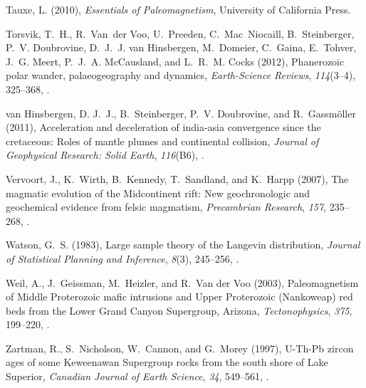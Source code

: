 \documentclass[draft,gc]{AGUTeX}
\begin{document}
\begin{article}
\begin{thebibliography}{24}
{Tauxe}, L. (2010), \textit{Essentials of Paleomagnetism}, University of
  California Press.
  
Torsvik, T.~H., R.~Van~der Voo, U.~Preeden, C.~Mac~Niocaill, B.~Steinberger,
  P.~V. Doubrovine, D.~J.~J. van Hinsbergen, M.~Domeier, C.~Gaina, E.~Tohver,
  J.~G. Meert, P.~J.~A. McCausland, and L.~R.~M. Cocks (2012), Phanerozoic
  polar wander, palaeogeography and dynamics, \textit{Earth-Science Reviews},
  \textit{114}(3--4), 325--368, .

van Hinsbergen, D. J.~J., B.~Steinberger, P.~V. Doubrovine, and
  R.~Gassm{\"o}ller (2011), Acceleration and deceleration of india-asia
  convergence since the cretaceous: Roles of mantle plumes and continental
  collision, \textit{Journal of Geophysical Research: Solid Earth},
  \textit{116}(B6), .

Vervoort, J., K.~Wirth, B.~Kennedy, T.~Sandland, and K.~Harpp (2007), The
  magmatic evolution of the {M}idcontinent rift: New geochronologic and
  geochemical evidence from felsic magmatism, \textit{Precambrian Research},
  \textit{157}, 235--268, .

Watson, G.~S. (1983), Large sample theory of the Langevin distribution,
  \textit{Journal of Statistical Planning and Inference}, \textit{8}(3),
  245--256, .
  
Weil, A., J.~Geissman, M.~Heizler, and R.~{Van der Voo} (2003), Paleomagnetism
  of {M}iddle {P}roterozoic mafic intrusions and {U}pper {P}roterozoic
  ({N}ankoweap) red beds from the {L}ower {G}rand {C}anyon {S}upergroup,
  {A}rizona, \textit{Tectonophysics}, \textit{375}, 199--220,
  .

Zartman, R., S.~Nicholson, W.~Cannon, and G.~Morey (1997), {U-Th-Pb} zircon
  ages of some {K}eweenawan {S}upergroup rocks from the south shore of {L}ake
  {S}uperior, \textit{Canadian Journal of Earth Science}, \textit{34},
  549--561, .


\end{thebibliography}
\end{article}
\end{document}
